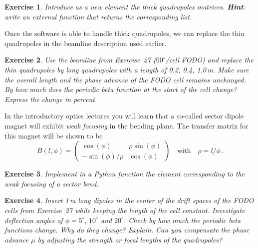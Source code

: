 \documentclass{article}
\newtheorem{exercise}{Exercise}
\begin{document}
\begin{exercise}
Introduce as a new element the thick quadrupoles matrices.
\textbf{Hint}:  write an external function that returns the corresponding list. 
\end{exercise}

Once the software is able to handle thick quadrupoles, we can replace the thin quadrupoles
in the beamline description used earlier.

\begin{exercise}
Use the beamline from Exercise~27 ($60^\circ$/cell FODO) and replace the thin quadrupoles by long quadrupoles with a length of 0.2, 0.4, 1.0\,m. Make sure the overall length and the phase advance of the FODO cell remains unchanged. By how much does the periodic beta function at the start of the cell change? Express the change in percent. 
\end{exercise}

In the introductory optics lectures you will learn that a so-called sector dipole magnet
will exhibit {\em weak focusing} in the bending plane. The transfer matrix for this 
magnet will be shown to be 
\begin{equation}\label{eq:BB}
B(l,\phi)=\left(\begin{array}{cc}
\cos(\phi) & \rho\sin(\phi) \\ -\sin(\phi)/\rho & \cos(\phi)
\end{array}\right)
\quad\mathrm{with}\quad \rho=l/\phi\, .
\end{equation}

\begin{exercise}
Implement in a Python function the element corresponding to the weak focusing of a sector bend.
\end{exercise}

\begin{exercise}
Insert 1\,m long dipoles in the center of the drift spaces of the FODO cells from Exercise~27 while keeping the length of the cell constant. Investigate deflection angles of $\phi=5^\circ,\, 10^\circ$ and $20^\circ$. Check by how much the periodic beta functions change. Why do they change? Explain. Can you compensate the phase advance $\mu$ by adjusting the strength or focal lengths of the quadrupoles?
\end{exercise}
\end{document}
